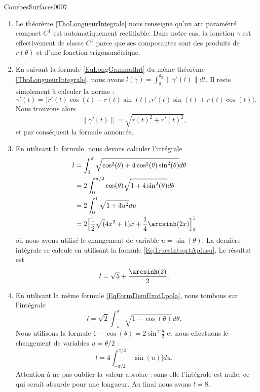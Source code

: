 \begin{corrige}{CourbesSurfaces0007}

	\begin{enumerate}
		\item
			Le théorème \ref{ThoLongueurIntegrale} nous renseigne qu'un arc paramétré compact $C^1$ est automatiquement rectifiable. Dans notre cas, la fonction $\gamma$ est effectivement de classe $C^1$ parce que ses composantes sont des produits de $r(\theta)$ et d'une fonction trigonométrique.
		\item
			En suivant la formule \eqref{EqLongGammalInt} du même théorème \ref{ThoLongueurIntegrale}, nous avons $l(\gamma)=\int_{\theta_1}^{\theta_2}\| \gamma'(t) \|dt$. Il reste simplement à calculer la norme :
			\begin{equation}
				\gamma'(t)=\big( r'(t)\cos(t)-r(t)\sin(t),r'(t)\sin(t)+r(t)\cos(t) \big).
			\end{equation}
			Nous trouvons alors
			\begin{equation}
				\| \gamma'(t) \|=\sqrt{ r(t)^2+r'(t)^2 },
			\end{equation}
			et par conséquent la formule annoncée.
		\item
			En utilisant la formule, nous devons calculer l'intégrale
			\begin{equation}
				\begin{aligned}[]
					l&=\int_0^{\pi}\sqrt{\cos^2(\theta)+4\cos^2(\theta)\sin^2(\theta)}d\theta\\
					&=2\int_0^{\pi/2}\cos(\theta)\sqrt{1+4\sin^2(\theta)}d\theta\\
					&=2\int_0^1\sqrt{1+3u^2}du\\
                    &=2\Big[ \frac{ 1 }{2}\sqrt(4x^2 + 1)x + \frac{1}{ 4 }\arcsinh(2x)\Big]_0^1\\
				\end{aligned}
			\end{equation}
			où nous avons utilisé le changement de variable $u=\sin(\theta)$. La dernière intégrale se calcule en utilisant la formule \eqref{EqTrucsIntsqrtAplusu}. Le résultat est
			\begin{equation}
                l=\sqrt{5}+\frac{ \arcsinh(2) }{2}.
			\end{equation}
		\item
			En utilisant la même formule \eqref{EqFormDemExotLpola}, nous tombons sur l'intégrale
			\begin{equation}
				l=\sqrt{2}\int_{-\pi}^{\pi}\sqrt{1-\cos(\theta)}d\theta.
			\end{equation}
			Nous utilisons la formule $1-\cos(\theta)=2\sin^2\frac{ \theta }{2}$ et nous effectuons le changement de variables $u=\theta/2$ :
			\begin{equation}
				l=4\int_{-\pi/2}^{\pi/2}| \sin(u) |du.
			\end{equation}
			Attention à ne pas oublier la valeur absolue : sans elle l'intégrale est nulle, ce qui serait absurde pour une longueur. Au final nous avons $l=8$. 
			
	\end{enumerate}

\end{corrige}
